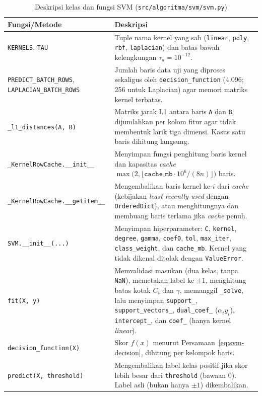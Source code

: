 \begin{table}[H]
	\centering
	\caption{Deskripsi kelas dan fungsi SVM (\texttt{src/algoritma/svm/svm.py})}
	\label{tab:svm-fungsi}
	\small
	\begin{tabularx}{\textwidth}{>{\raggedright\arraybackslash}p{4.8cm} Y}
		\toprule
		\textbf{Fungsi/Metode} & \textbf{Deskripsi} \\
		\midrule
		\texttt{KERNELS}, \texttt{TAU} & Tuple nama kernel yang sah (\texttt{linear}, \texttt{poly}, \texttt{rbf}, \texttt{laplacian}) dan batas bawah kelengkungan $\tau_a = 10^{-12}$. \\
		\texttt{PREDICT\_BATCH\_ROWS}, \texttt{LAPLACIAN\_BATCH\_ROWS} & Jumlah baris data uji yang diproses sekaligus oleh \texttt{decision\_function} (4.096; 256 untuk Laplacian) agar memori matriks kernel terbatas. \\
		\texttt{\_l1\_distances(A, B)} & Matriks jarak L1 antara baris \texttt{A} dan \texttt{B}, dijumlahkan per kolom fitur agar tidak membentuk larik tiga dimensi. Kasus satu baris dihitung langsung. \\
		\texttt{\_KernelRowCache.\_\_init\_\_} & Menyimpan fungsi penghitung baris kernel dan kapasitas \textit{cache} $\max\big(2, \lfloor \texttt{cache\_mb}\cdot 10^6 / (8n)\rfloor\big)$ baris. \\
		\texttt{\_KernelRowCache.\_\_getitem\_\_} & Mengembalikan baris kernel ke-$i$ dari \textit{cache} (kebijakan \textit{least recently used} dengan \texttt{OrderedDict}), atau menghitungnya dan membuang baris terlama jika \textit{cache} penuh. \\
		\texttt{SVM.\_\_init\_\_(...)} & Menyimpan hiperparameter: \texttt{C}, \texttt{kernel}, \texttt{degree}, \texttt{gamma}, \texttt{coef0}, \texttt{tol}, \texttt{max\_iter}, \texttt{class\_weight}, dan \texttt{cache\_mb}. Kernel yang tidak dikenal ditolak dengan \texttt{ValueError}. \\
		\texttt{fit(X, y)} & Memvalidasi masukan (dua kelas, tanpa \texttt{NaN}), memetakan label ke $\pm 1$, menghitung batas kotak $C_i$ dan $\gamma$, memanggil \texttt{\_solve}, lalu menyimpan \texttt{support\_}, \texttt{support\_vectors\_}, \texttt{dual\_coef\_} ($\alpha_i y_i$), \texttt{intercept\_}, dan \texttt{coef\_} (hanya kernel \textit{linear}). \\
		\texttt{decision\_function(X)} & Skor $f(x)$ menurut Persamaan~\eqref{eq:svm-decision}, dihitung per kelompok baris. \\
		\texttt{predict(X, threshold)} & Mengembalikan label kelas positif jika skor lebih besar dari \texttt{threshold} (bawaan 0). Label asli (bukan hanya $\pm 1$) dikembalikan. \\

\end{tabularx}
\end{table}
